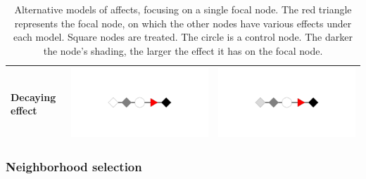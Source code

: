\documentclass[12pt]{article}
\begin{document}
\begin{table}[h]
\begin{tabular}{|>{\centering\arraybackslash}m{2.75cm}|>{\centering\arraybackslash}m{5.5cm}|>{\centering\arraybackslash}m{5.5cm}|}
Decaying effect &  \includegraphics[scale=.225,clip=true,trim = 13cm 10cm 13cm 10cm]{./images/effect_decay_twohops} &  \includegraphics[scale=.225,clip=true,trim = 13cm 10cm 13cm 10cm]{./images/effect_decay_threehops} \\
\hline 
\end{tabular}

\caption{Alternative models of affects, focusing on a single focal node. The red triangle represents the focal node, on which the other nodes have various effects under each model. Square nodes are treated. The circle is a control node. The darker the node's shading, the larger the effect it has on the focal node.}
\label{tab:fourmodels}
\end{table}

\subsubsection{Neighborhood selection}
\end{document}
